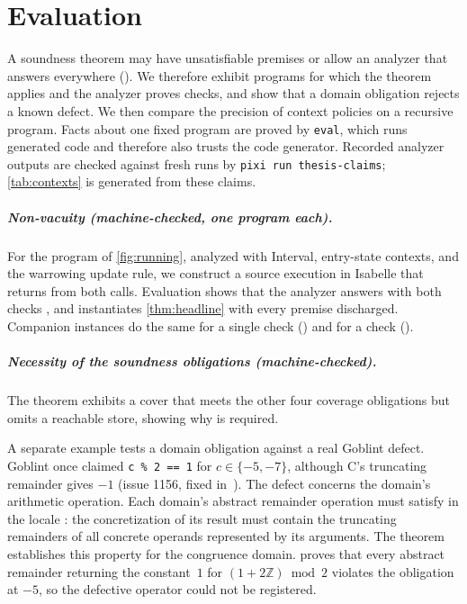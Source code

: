 \section{Evaluation}
\label{sec:evaluation}

A soundness theorem may have unsatisfiable premises or allow an analyzer that
answers  everywhere ().
We therefore exhibit programs for which the theorem applies and the analyzer
proves checks, and show that a domain obligation rejects a known defect.
We then compare the precision of context policies on a recursive program.
Facts about one fixed program are proved by \texttt{eval}, which runs
generated code and therefore also trusts the code generator. Recorded analyzer outputs
are checked against fresh runs by \texttt{pixi run thesis-claims};
\cref{tab:contexts} is generated from these claims.

\subparagraph*{Non-vacuity (machine-checked, one program each).}
For the program of \cref{fig:running}, analyzed with Interval, entry-state
contexts, and the warrowing update rule, we construct a source execution in Isabelle
that returns from both calls. Evaluation shows that the analyzer answers with
both checks , and  instantiates
\cref{thm:headline} with every premise discharged. Companion instances do the
same for a single check () and for a
 check ().

\subparagraph*{Necessity of the soundness obligations (machine-checked).}
The theorem  exhibits a cover that meets the
other four coverage obligations but omits a reachable store, showing why
 is required.

A separate example tests a domain obligation against a real Goblint defect.
Goblint once claimed \texttt{c \% 2 == 1} for $c \in \{-5, -7\}$,
although C's truncating remainder gives $-1$ (issue 1156, fixed
in~\cite{goblint1161}). The defect concerns the domain's arithmetic operation. Each domain's
abstract remainder operation must satisfy  in the locale
: the concretization of its result must contain the truncating remainders
of all concrete operands represented by its arguments.
The theorem  establishes this property for the
congruence domain.  proves
that every abstract remainder returning the constant~$1$ for
$(1 + 2\mathbb{Z}) \bmod 2$ violates the obligation at $-5$, so the defective
operator could not be registered.

